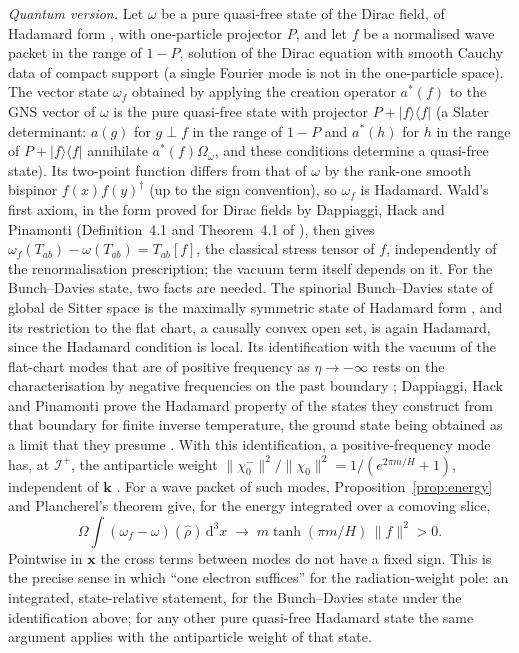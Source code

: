 \documentclass[11pt,a4paper]{article}
\theoremstyle{definition}
\newcommand{\scri}{\mathscr{I}^{+}}
\newcommand{\dd}{\mathrm{d}}
\begin{document}
\emph{Quantum version.} Let $\omega$ be a pure quasi-free state of the Dirac field, of Hadamard form \cite{Hollands2001,DHP2009}, with one-particle projector $P$, and let $f$ be a normalised wave packet in the range of $1-P$, solution of the Dirac equation with smooth Cauchy data of compact support (a single Fourier mode is not in the one-particle space). The vector state $\omega_{f}$ obtained by applying the creation operator $a^{*}(f)$ to the GNS vector of $\omega$ is the pure quasi-free state with projector $P+|f\rangle\langle f|$ (a Slater determinant: $a(g)$ for $g\perp f$ in the range of $1-P$ and $a^{*}(h)$ for $h$ in the range of $P+|f\rangle\langle f|$ annihilate $a^{*}(f)\Omega_{\omega}$, and these conditions determine a quasi-free state). Its two-point function differs from that of $\omega$ by the rank-one smooth bispinor $f(x)f(y)^{\dagger}$ (up to the sign convention), so $\omega_{f}$ is Hadamard. Wald's first axiom, in the form proved for Dirac fields by Dappiaggi, Hack and Pinamonti (Definition~4.1 and Theorem~4.1 of \cite{DHP2009}), then gives $\omega_{f}(T_{ab})-\omega(T_{ab})=T_{ab}[f]$, the classical stress tensor of $f$, independently of the renormalisation prescription; the vacuum term itself depends on it. For the Bunch--Davies state, two facts are needed. The spinorial Bunch--Davies state of global de Sitter space is the maximally symmetric state of Hadamard form \cite{AllenLutken1986,DFMR2019}, and its restriction to the flat chart, a causally convex open set, is again Hadamard, since the Hadamard condition is local. Its identification with the vacuum of the flat-chart modes that are of positive frequency as $\eta\to-\infty$ rests on the characterisation by negative frequencies on the past boundary \cite{DFMR2019,DHP2010}; Dappiaggi, Hack and Pinamonti prove the Hadamard property of the states they construct from that boundary for finite inverse temperature, the ground state being obtained as a limit that they presume \cite{DHP2010}. With this identification, a positive-frequency mode has, at $\scri$, the antiparticle weight $\|\chi_{0}^{-}\|^{2}/\|\chi_{0}\|^{2}=1/(e^{2\pi m/H}+1)$, independent of $\mathbf{k}$ \cite{Boonpan2026}. For a wave packet of such modes, Proposition~\ref{prop:energy} and Plancherel's theorem give, for the energy integrated over a comoving slice,
\begin{equation}
\Omega\int(\omega_{f}-\omega)(\hat\rho)\,\dd^{3}x\;\longrightarrow\;m\tanh(\pi m/H)\,\|f\|^{2}>0 .
\end{equation}
Pointwise in $\mathbf{x}$ the cross terms between modes do not have a fixed sign. This is the precise sense in which ``one electron suffices'' for the radiation-weight pole: an integrated, state-relative statement, for the Bunch--Davies state under the identification above; for any other pure quasi-free Hadamard state the same argument applies with the antiparticle weight of that state.
\end{document}
